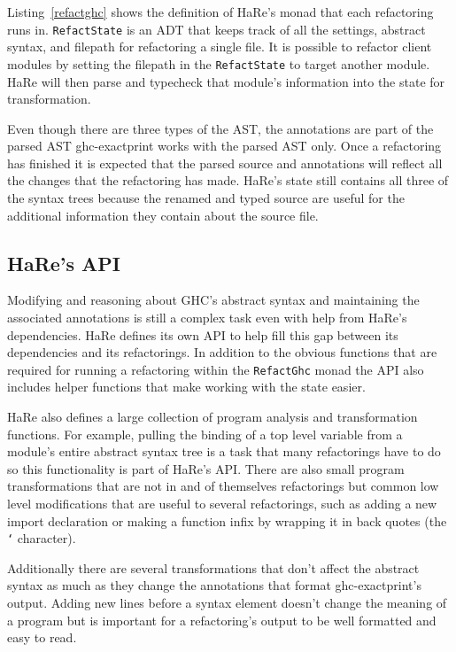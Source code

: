 Listing~\ref{refactghc} shows the definition of HaRe's monad that each refactoring runs in. \texttt{RefactState} is an ADT that keeps track of all the settings, abstract syntax, and filepath for refactoring a single file. It is possible to refactor client modules by setting the filepath in the \texttt{RefactState} to target another module. HaRe will then parse and typecheck that module's information into the state for transformation.

Even though there are three types of the AST, the annotations are part of the parsed AST ghc-exactprint works with the parsed AST only. Once a refactoring has finished it is expected that the parsed source and annotations will reflect all the changes that the refactoring has made. HaRe's state still contains all three of the syntax trees because the renamed and typed source are useful for the additional information they contain about the source file. 

\subsection{HaRe's API}

Modifying and reasoning about GHC's abstract syntax and maintaining the associated annotations is still a complex task even with help from HaRe's dependencies. HaRe defines its own API to help fill this gap between its dependencies and its refactorings. In addition to the obvious functions that are required for running a refactoring within the \texttt{RefactGhc} monad the API also includes helper functions that make working with the state easier. 

HaRe also defines a large collection of program analysis and transformation functions. For example, pulling the binding of a top level variable from a module's entire abstract syntax tree is a task that many refactorings have to do so this functionality is part of HaRe's API. There are also small program transformations that are not in and of themselves refactorings but common low level modifications that are useful to several refactorings, such as adding a new import declaration or making a function infix by wrapping it in back quotes (the \texttt{`} character).

Additionally there are several transformations that don't affect the abstract syntax as much as they change the annotations that format ghc-exactprint's output. Adding new lines before a syntax element doesn't change the meaning of a program but is important for a refactoring's output to be well formatted and easy to read. 

